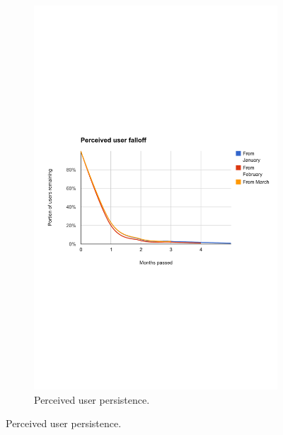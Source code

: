 \begin{figure}[t]
  \centering
  \begin{subfigure}[t]{\textwidth}
    \includegraphics[width=\textwidth]{Figures/plots/user-dropoff/months-jan-mar}
    \caption{Perceived user persistence.}
  \end{subfigure}

  \vspace{1em}


\end{figure}
